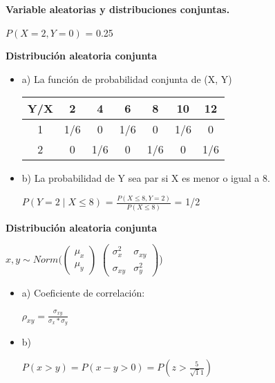 \documentclass{../oxmathproblems}
\begin{document}
\begin{questions}

\miquestion \textbf {Variable aleatorias y distribuciones conjuntas.}

$P(X=2,Y=0) $ = 0.25



\miquestion\textbf{Distribución aleatoria conjunta}
\begin{itemize}
\item  a) La función de probabilidad conjunta de (X, Y)

\begin{center}
\begin{tabular}{ |c|c|c|c|c|c|c| } 
\hline
Y/X & 2 & 4 & 6 & 8 & 10 & 12 \\
\hline
1 & 1/6 & 0 & 1/6 & 0 & 1/6 & 0 \\
2 & 0 & 1/6 & 0 & 1/6 & 0 & 1/6 \\
\hline
\end{tabular}
\end{center}

\item  b) La probabilidad de Y sea par si X es menor o igual a 8. 


$P(Y = 2 \mid X \leq 8)$ =  $\frac{P(X \leq 8,Y = 2)}{P(X \leq 8)}$
= 1/2
\end{itemize}


\miquestion\textbf{Distribución aleatoria conjunta}

$ x,y \sim Norm(\begin{pmatrix} \mu_x \\ \mu_y \end{pmatrix} $ $\begin{pmatrix} \sigma_x^2  & \sigma_{xy}\\ \sigma_{xy} & \sigma_{y}^2\end{pmatrix} $) 


\begin{itemize}
\item  a) Coeficiente de correlación: 

 $ \rho_{xy} = \frac{\sigma_{xy}}{\sigma_x * \sigma_y} $ 



\item  b) 


$ P(x>y) = P (x-y >0) = P (z > \frac{5}{\sqrt11}) $ 


\end{itemize}
\end{questions}
\end{document}
